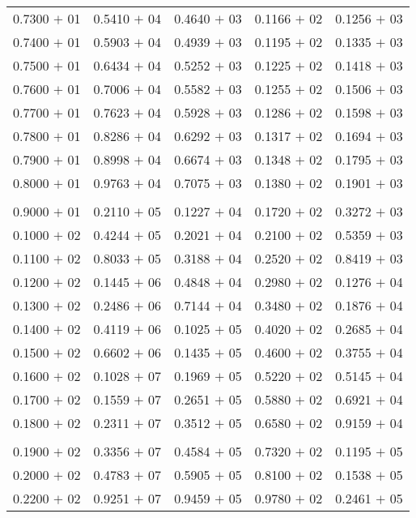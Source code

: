 \documentclass[a4paper,11pt]{article}
\begin{document}
\begin{center}
\begin{longtable}{ c c c c c }
0.7300 $+$ 01 & 0.5410 $+$ 04 & 0.4640 $+$ 03 & 0.1166 $+$ 02 & 0.1256 $+$ 03 \\
0.7400 $+$ 01 & 0.5903 $+$ 04 & 0.4939 $+$ 03 & 0.1195 $+$ 02 & 0.1335 $+$ 03 \\
0.7500 $+$ 01 & 0.6434 $+$ 04 & 0.5252 $+$ 03 & 0.1225 $+$ 02 & 0.1418 $+$ 03 \\
0.7600 $+$ 01 & 0.7006 $+$ 04 & 0.5582 $+$ 03 & 0.1255 $+$ 02 & 0.1506 $+$ 03 \\
0.7700 $+$ 01 & 0.7623 $+$ 04 & 0.5928 $+$ 03 & 0.1286 $+$ 02 & 0.1598 $+$ 03 \\
0.7800 $+$ 01 & 0.8286 $+$ 04 & 0.6292 $+$ 03 & 0.1317 $+$ 02 & 0.1694 $+$ 03 \\
0.7900 $+$ 01 & 0.8998 $+$ 04 & 0.6674 $+$ 03 & 0.1348 $+$ 02 & 0.1795 $+$ 03 \\
0.8000 $+$ 01 & 0.9763 $+$ 04 & 0.7075 $+$ 03 & 0.1380 $+$ 02 & 0.1901 $+$ 03 \\
\\
0.9000 $+$ 01 & 0.2110 $+$ 05 & 0.1227 $+$ 04 & 0.1720 $+$ 02 & 0.3272 $+$ 03 \\
0.1000 $+$ 02 & 0.4244 $+$ 05 & 0.2021 $+$ 04 & 0.2100 $+$ 02 & 0.5359 $+$ 03 \\
0.1100 $+$ 02 & 0.8033 $+$ 05 & 0.3188 $+$ 04 & 0.2520 $+$ 02 & 0.8419 $+$ 03 \\
0.1200 $+$ 02 & 0.1445 $+$ 06 & 0.4848 $+$ 04 & 0.2980 $+$ 02 & 0.1276 $+$ 04 \\
0.1300 $+$ 02 & 0.2486 $+$ 06 & 0.7144 $+$ 04 & 0.3480 $+$ 02 & 0.1876 $+$ 04 \\
0.1400 $+$ 02 & 0.4119 $+$ 06 & 0.1025 $+$ 05 & 0.4020 $+$ 02 & 0.2685 $+$ 04 \\
0.1500 $+$ 02 & 0.6602 $+$ 06 & 0.1435 $+$ 05 & 0.4600 $+$ 02 & 0.3755 $+$ 04 \\
0.1600 $+$ 02 & 0.1028 $+$ 07 & 0.1969 $+$ 05 & 0.5220 $+$ 02 & 0.5145 $+$ 04 \\
0.1700 $+$ 02 & 0.1559 $+$ 07 & 0.2651 $+$ 05 & 0.5880 $+$ 02 & 0.6921 $+$ 04 \\
0.1800 $+$ 02 & 0.2311 $+$ 07 & 0.3512 $+$ 05 & 0.6580 $+$ 02 & 0.9159 $+$ 04 \\
\\
0.1900 $+$ 02 & 0.3356 $+$ 07 & 0.4584 $+$ 05 & 0.7320 $+$ 02 & 0.1195 $+$ 05 \\
0.2000 $+$ 02 & 0.4783 $+$ 07 & 0.5905 $+$ 05 & 0.8100 $+$ 02 & 0.1538 $+$ 05 \\
0.2200 $+$ 02 & 0.9251 $+$ 07 & 0.9459 $+$ 05 & 0.9780 $+$ 02 & 0.2461 $+$ 05 \\

\end{longtable}
\end{center}
\end{document}
